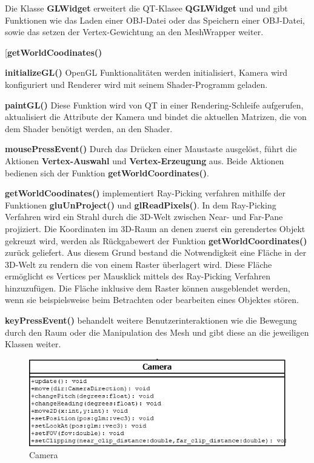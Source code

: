 	Die Klasse \textbf{GLWidget} erweitert die QT-Klasee \textbf{QGLWidget} und und gibt Funktionen wie das Laden einer OBJ-Datei oder das Speichern einer OBJ-Datei, sowie das setzen der Vertex-Gewichtung an den MeshWrapper weiter.\newline\newline

	\begin{labeling}[]{[\textbf{getWorldCoodinates()}}%
	\item[\textbf{initializeGL()}] OpenGL Funktionalitäten werden initialisiert, Kamera wird konfiguriert und Renderer wird mit seinem Shader-Programm geladen.
	\item[\textbf{paintGL()}] Diese Funktion wird von QT in einer Rendering-Schleife aufgerufen, aktualisiert die Attribute der Kamera und bindet  die aktuellen Matrizen, die von dem Shader benötigt werden, an den Shader.
	\item[\textbf{mousePressEvent()}] Durch das Drücken einer Maustaste ausgelöst, führt die Aktionen \textbf{Vertex-Auswahl} und \textbf{Vertex-Erzeugung} aus. Beide Aktionen bedienen sich der Funktion \textbf{getWorldCoordinates()}.
	\item[\textbf{getWorldCoodinates()}]  implementiert Ray-Picking verfahren mithilfe der Funktionen \textbf{gluUnProject()} und \textbf{glReadPixels()}. In dem Ray-Picking Verfahren wird ein Strahl durch die 3D-Welt zwischen Near- und Far-Pane projiziert. Die Koordinaten im 3D-Raum an denen zuerst ein gerendertes Objekt gekreuzt wird, werden als Rückgabewert der Funktion \textbf{getWorldCoordinates()} zurück geliefert. Aus diesem Grund bestand die Notwendigkeit eine Fläche in der 3D-Welt zu rendern die von einem Raster überlagert wird. Diese Fläche ermöglicht es Vertices per Mausklick mittels des Ray-Picking Verfahren hinzuzufügen. Die Fläche inklusive dem Raster können ausgeblendet werden, wenn sie beispielsweise beim Betrachten oder bearbeiten eines Objektes stören.
	\item[\textbf{keyPressEvent()}] behandelt weitere Benutzerinteraktionen wie die Bewegung durch den Raum oder die Manipulation des Mesh und gibt diese an die jeweiligen Klassen weiter.
	\end{labeling}
		
	\begin{figure}[H]
	\centering
	\includegraphics[width=0.7\linewidth]{camera.png}
	\caption{Camera}
	\label{fig3}
	\end{figure}

